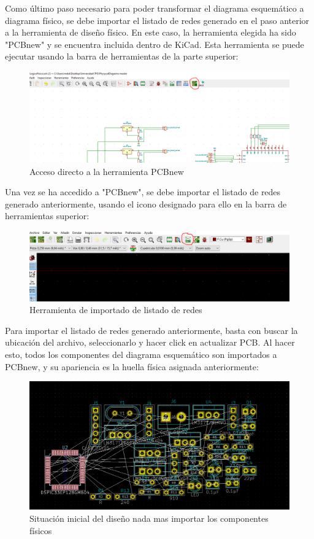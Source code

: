 Como último paso necesario para poder transformar el diagrama esquemático a diagrama físico, se debe importar el listado de redes generado en el paso anterior a la herramienta de diseño físico. En este caso, la herramienta elegida ha sido "PCBnew" y se encuentra incluida dentro de KiCad. Esta herramienta se puede ejecutar usando la barra de herramientas de la parte superior:

\begin{figure}[H]
\centering 
\includegraphics[width=0.9\linewidth]{pictures/PCBNEW.PNG}
\caption{Acceso directo a la herramienta PCBnew}
\label{fig:kdiagram}
\end{figure}

Una vez se ha accedido a "PCBnew", se debe importar el listado de redes generado anteriormente, usando el icono designado para ello en la barra de herramientas superior:

\begin{figure}[H]
\centering 
\includegraphics[width=0.9\linewidth]{pictures/redesPCB.PNG}
\caption{Herramienta de importado de listado de redes}
\label{fig:kdiagram}
\end{figure}

Para importar el listado de redes generado anteriormente, basta con buscar la ubicación del archivo, seleccionarlo y hacer click en actualizar PCB. Al hacer esto, todos los componentes del diagrama esquemático son importados a PCBnew, y su apariencia es la huella física asignada anteriormente:

\begin{figure}[H]
\centering 
\includegraphics[width=0.9\linewidth]{pictures/bunch.PNG}
\caption{Situación inicial del diseño nada mas importar los componentes físicos}
\label{fig:kdiagram}
\end{figure}


